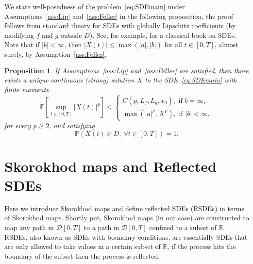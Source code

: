 \documentclass[11pt]{amsart}
\newtheorem{proposition}[theorem]{Proposition}
\newcommand{\E}{{\mathbb E}}
\newcommand{\PP}{{\mathbb P}}
\begin{document}
{We state well-posedness of the problem~\eqref{eq:SDEmain} under Assumptions~\ref{ass:Lip} and~\ref{ass:Feller} in the following proposition, the proof follows from standard theory for SDEs with globally Lipschitz coefficients (by modifying $f$ and $g$ outside $D$). See, for example, \cite{MR2001996} for a classical book on SDEs. Note that if $|b|<\infty$, then $|X(t)| \leq \max(|a|,|b|)$ for all $t \in [0,T]$, almost surely, by Assumption~\ref{ass:Feller}.
\begin{proposition}\label{prop:xproperties}
If Assumptions~\ref{ass:Lip} and~\ref{ass:Feller} are satisfied, then there exists a unique continuous (strong) solution $X$ to the SDE~\eqref{eq:SDEmain} with finite moments
\begin{equation*}
\E \left[ \sup_{t \in [0,T]} |X(t)|^{p} \right] \leq
\begin{cases}
C(p,L_{f},L_{g},x_{0}), \text{ if } b = \infty,\\
\max(|a|^{p},|b|^{p}), \text{ if } |b| < \infty,
\end{cases}
\end{equation*}
for every $p \geq 2$, and satisfying
\begin{equation*}
\PP \left( X(t) \in D,\ \forall t \in [0,T] \right)= 1.
\end{equation*}
\end{proposition}

\section{Skorokhod maps and Reflected SDEs}\label{sec:SkorMapAndRSDE}
Here we introduce Skorokhod maps and define reflected SDEs (RSDEs) in terms of Skorokhod maps. Shortly put, Skorokhod maps (in our case) are constructed to map any path in $\mathcal{D}[0,T]$ to a path in $\mathcal{D}[0,T]$ confined to a subset of $\mathbb{R}$. RSDEs, also known as SDEs with boundary conditions, are essentially SDEs that are only allowed to take values in a certain subset of $\mathbb{R}$, if the process hits the boundary of the subset then the process is reflected. 

}
\end{document}
